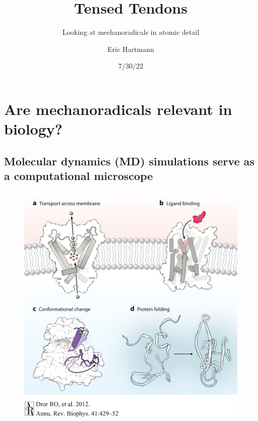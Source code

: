 \documentclass[
  letterpaper,
  DIV=11,
  numbers=noendperiod]{scrartcl}
\title{Tensed Tendons}
\subtitle{Looking at mechanoradicals in atomic detail}
\author{Eric Hartmann}
\date{7/30/22}
\begin{document}
\maketitle
\ifdefined\Shaded\renewenvironment{Shaded}{\begin{tcolorbox}[enhanced, interior hidden, borderline west={3pt}{0pt}{shadecolor}, breakable, sharp corners, frame hidden, boxrule=0pt]}{\end{tcolorbox}}\fi

\hypertarget{section}{%
\section{}\label{section}}

\hypertarget{are-mechanoradicals-relevant-in-biology}{%
\section{Are mechanoradicals relevant in
biology?}\label{are-mechanoradicals-relevant-in-biology}}

\hypertarget{molecular-dynamics-md-simulations-serve-as-a-computational-microscope}{%
\subsection{Molecular dynamics (MD) simulations serve as a computational
microscope}\label{molecular-dynamics-md-simulations-serve-as-a-computational-microscope}}

\begin{figure}

{\centering \includegraphics{www/Comp_microscope.jpeg}

}

\end{figure}
\end{document}
